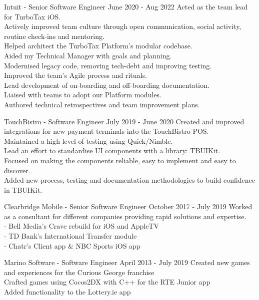 \documentclass[
	10pt, %
]{FreemanCV}
\begin{document}
\begin{paracol}{2}

\jobentry
	{Intuit - Senior Software Engineer}
	{June 2020 - Aug 2022}
	{Acted as the team lead for TurboTax iOS.\\
    Actively improved team culture through open communication, social activity, routine check-ins and mentoring.\\
    Helped architect the TurboTax Platform's modular codebase.\\
    Aided my Technical Manager with goals and planning.\\
    Modernised legacy code, removing tech-debt and improving testing.\\
    Improved the team's Agile process and rituals.\\
    Lead development of on-boarding and off-boarding documentation.\\
    Liaised with teams to adopt our Platform modules.\\
    Authored technical retrospectives and team improvement plans.}


\jobentry
	{TouchBistro - Software Engineer}
    {July 2019 - June 2020}
    {Created and improved integrations for new payment terminals into the TouchBistro POS.\\
    Maintained a high level of testing using Quick/Nimble.\\
    Lead an effort to standardise UI components with a library: TBUIKit.\\
    Focused on making the components reliable, easy to implement and easy to discover.\\
    Added new process, testing and documentation methodologies to build confidence in TBUIKit.}


\jobentry
    {Clearbridge Mobile - Senior Software Engineer}
    {October 2017 - July 2019}
    {Worked as a consultant for different companies providing rapid solutions and expertise.\\
    - Bell Media's Crave rebuild for iOS and AppleTV\\
    - TD Bank's International Transfer module\\
    - Chatr's Client app \& NBC Sports iOS app}
    


\jobentry
    {Marino Software - Software Engineer}
    {April 2013 - July 2019}
    {Created new games and experiences for the Curious George franchise\\
    Crafted games using Cocos2DX with C++ for the RTE Junior app\\
    Added functionality to the Lottery.ie app}


\end{paracol}
\end{document}
